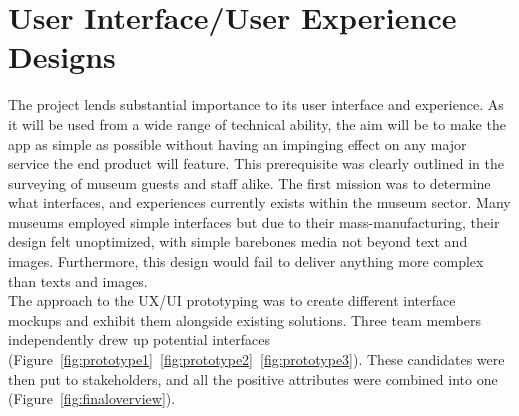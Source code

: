 \section{User Interface/User Experience Designs}
The project lends substantial importance to its user interface and experience. As it will be used from a wide range of technical ability, the aim will be to make the app as simple as possible without having an impinging effect on any major service the end product will feature. This prerequisite was clearly outlined in the surveying of museum guests and staff alike. The first mission was to determine what interfaces, and experiences currently exists within the museum sector. Many museums employed simple interfaces but due to their mass-manufacturing, their design felt unoptimized, with simple barebones media not beyond text and images. Furthermore, this design would fail to deliver anything more complex than texts and images.\\
  
The approach to the UX/UI prototyping was to create different interface mockups and exhibit them alongside existing solutions. Three team members independently drew up potential interfaces (Figure~\ref{fig:prototype1}~\ref{fig:prototype2}~\ref{fig:prototype3}). These candidates were then put to stakeholders, and all the positive attributes were combined into one (Figure~\ref{fig:finaloverview}).